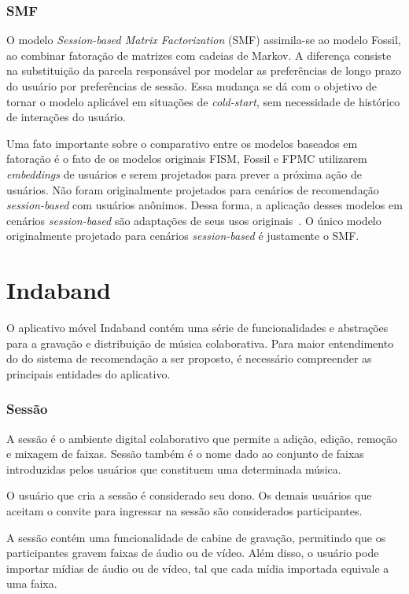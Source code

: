 \subsubsection{SMF}
 O modelo
\textit{Session-based Matrix Factorization} (SMF) \cite{ludewig_2018}
assimila-se ao modelo Fossil, ao combinar fatoração de matrizes com cadeias de
Markov. A diferença consiste na substituição da parcela responsável por modelar
as preferências de longo prazo do usuário por preferências de sessão. Essa
mudança se dá com o objetivo de tornar o modelo aplicável em situações de
\textit{cold-start}, sem necessidade de histórico de interações do usuário.

Uma fato importante sobre o comparativo entre os modelos baseados em fatoração é
o fato de os modelos originais FISM, Fossil e FPMC utilizarem
\textit{embeddings} de usuários e serem projetados para prever a próxima ação de
usuários. Não foram originalmente projetados para cenários de recomendação
\textit{session-based} com usuários anônimos. Dessa forma, a aplicação desses
modelos em cenários \textit{session-based} são adaptações de seus usos
originais~\cite{ludewig2020advances}. O único modelo originalmente projetado
para cenários \textit{session-based} é justamente o SMF.

\section{Indaband}

O aplicativo móvel Indaband contém uma série de funcionalidades e abstrações
para a gravação e distribuição de música colaborativa. Para maior entendimento
do do sistema de recomendação a ser proposto, é necessário compreender as
principais entidades do aplicativo.

\subsubsection{Sessão}

A sessão é o ambiente digital colaborativo que permite a adição, edição, remoção e mixagem de faixas. Sessão também é o nome dado ao conjunto de faixas introduzidas pelos usuários que constituem uma determinada música.

O usuário que cria a sessão é considerado seu dono. Os demais
usuários que aceitam o convite para ingressar na sessão são considerados
participantes.

A sessão contém uma funcionalidade de cabine de gravação, permitindo que os
participantes gravem faixas de áudio ou de vídeo. Além disso, o usuário pode
importar mídias de áudio ou de vídeo, tal que cada mídia importada equivale a
uma faixa.

